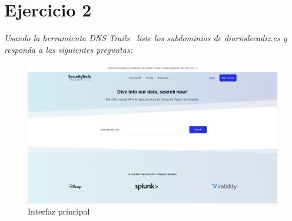 \documentclass[12pt]{book}
\begin{document}
\section{Ejercicio 2}
\textit{Usando la herramienta DNS Trails~\cite{DNSTrail} liste los subdominios de diariodecadiz.es y responda a las siguientes preguntas:}
\begin{figure}[h]
    \centering
    \includegraphics[width=\linewidth]{Practica 3y4/images/Screenshot 2024-10-31 at 09.41.49.png}
    \caption{Interfaz principal}
    \label{fig:enter-label}
\end{figure}
\end{document}
